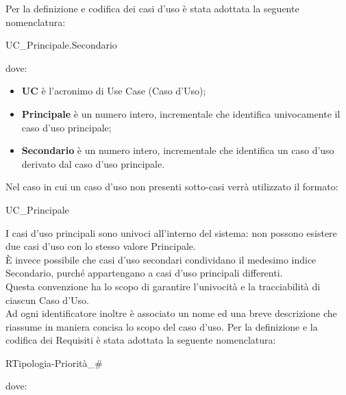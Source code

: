 		Per la definizione e codifica dei casi d’uso è stata adottata la seguente nomenclatura:
		\begin{center} UC\_Principale.Secondario \end{center}
		dove:
		\begin{itemize}[itemsep=3pt, parsep=1pt, label=$\scriptstyle\bullet$]
			\item \textbf{UC} è l’acronimo di Use Case (Caso d’Uso);
			\item  \textbf{Principale} è un numero intero, incrementale che identifica univocamente il caso d’uso principale;
			\item \textbf{Secondario} è un numero intero, incrementale che identifica un caso d’uso derivato dal caso d’uso principale.
		\end{itemize}
		Nel caso in cui un caso d’uso non presenti sotto-casi verrà utilizzato il formato:
		\begin{center} UC\_Principale \end{center}
		I casi d’uso principali sono univoci all’interno del sistema: non possono esistere due casi d’uso con lo stesso valore Principale.\\
		È invece possibile che casi d’uso secondari condividano il medesimo indice Secondario, purché appartengano a casi d’uso principali differenti.\\
		Questa convenzione ha lo scopo di garantire l’univocità e la tracciabilità di ciascun Caso d’Uso.\\ 
		Ad ogni identificatore inoltre è associato un nome ed una breve descrizione che riassume in maniera concisa lo scopo del caso d’uso.
		Per la definizione e la codifica dei Requisiti è stata adottata la seguente nomenclatura:
		\begin{center} RTipologia-Priorità\_\# \end{center}
		dove:
